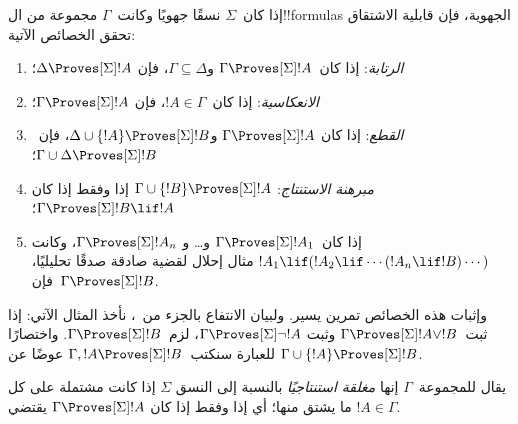 \documentclass[../../../include/open-logic-section]{subfiles}
\begin{document}


\begin{prop}
  إذا كان~$\Sigma$ نسقًا جهويًا وكانت~$\Gamma$ مجموعة من ال!!{formula}s
  الجهوية، فإن قابلية الاشتقاق تحقق الخصائص الآتية:
  \begin{enumerate}
  \item{} \emph{الرتابة}: إذا
    كان~$\Gamma \Proves[\Sigma] !A$ و$\Gamma \subseteq \Delta$، فإن
    $\Delta \Proves[\Sigma] !A$؛
  \item{}
    \emph{الانعكاسية}: إذا كان~$!A \in \Gamma$، فإن
    $\Gamma \Proves[\Sigma] !A$؛
  \item{} \emph{القطع}: إذا كان
    $\Gamma \Proves[\Sigma] !A$ و$\Delta \cup \{!A\}
    \Proves[\Sigma] !B$، فإن~$\Gamma \cup \Delta \Proves[\Sigma] !B$؛
  \item{} \emph{مبرهنة الاستنتاج}:
    $\Gamma \cup \{!B\} \Proves[\Sigma] !A$ إذا وفقط إذا كان
    $\Gamma \Proves[\Sigma] !B \lif !A$؛
  \item {}%
    إذا كان~$\Gamma \Proves[\Sigma] !A_1$ و\dots{} و
    $\Gamma \Proves[\Sigma] !A_n$، وكانت
    $!A_1 \lif (!A_2 \lif \cdots (!A_n \lif !B)\cdots)$ مثال إحلال
    لقضية صادقة صدقًا تحليليًا، فإن~$\Gamma \Proves[\Sigma] !B$.
  \end{enumerate}
\end{prop}

وإثبات هذه الخصائص تمرين يسير. ولبيان الانتفاع بالجزء
 من~،
نأخذ المثال الآتي: إذا ثبت~$\Gamma \Proves[\Sigma] !A \lor !B$ وثبت
$\Gamma \Proves[\Sigma] \lnot !A$، لزم~$\Gamma \Proves[\Sigma] !B$.
واختصارًا للعبارة سنكتب~$\Gamma, !A \Proves[\Sigma] !B$ عوضًا عن
$\Gamma \cup \{!A\} \Proves[\Sigma] !B$.

\begin{defn}
  يقال للمجموعة~$\Gamma$ إنها \emph{مغلقة استنتاجيًا} بالنسبة إلى النسق
  $\Sigma$ إذا كانت مشتملة على كل ما يشتق منها؛ أي إذا وفقط إذا كان
  $\Gamma \Proves[\Sigma] !A$ يقتضي $!A \in \Gamma$.
\end{defn}
\end{document}
